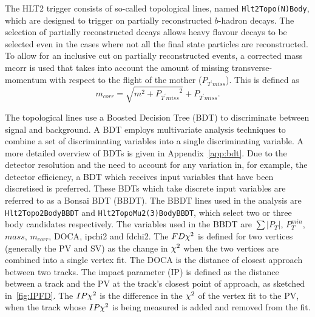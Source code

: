    
The HLT2 trigger consists of so-called topological lines, named \texttt{Hlt2Topo(N)Body}, which are designed to trigger on partially reconstructed $b$-hadron decays. The selection of partially reconstructed decays allows heavy flavour decays to be selected even in the cases where not all the final state particles are reconstructed.    
To allow for an inclusive cut on partially reconstructed events, a corrected mass \gls{mcorr} is used that takes into account the amount of missing transverse-momentum with respect to the flight of the mother ($P_{T^{\prime} miss}$). This is defined as
\begin{equation}
  m_{corr} = \sqrt{m^{2} + {P_{T^{\prime} miss}}^{2}} + P_{T^{\prime}miss}.
\end{equation}

The topological lines use a Boosted Decision Tree (\Gls{BDT}) \cite{miniboone} to discriminate between signal and background. A BDT employs multivariate analysis techniques to combine a set of discriminating variables into a single discriminating variable. A more detailed overview of BDTs is given in Appendix~\ref{app:bdt}. Due to the detector resolution and the need to account for any variation in, for example, the detector efficiency, a BDT which receives input variables that have been discretised is preferred. These BDTs which take discrete input variables are referred to as a Bonsai BDT (\Gls{BBDT})\cite{bonsai}. The BBDT lines used in the \Lbpi analysis are \texttt{Hlt2Topo2BodyBBDT} and \texttt{Hlt2TopoMu2(3)BodyBBDT}, which select two or three body candidates respectively. The variables used in the BBDT are $\sum|P_{T}|$, $P^{min}_{T}$, $mass$, $m_{corr}$, \Gls{DOCA}, \gls{ipchi2} and \gls{fdchi2}\cite{BBDTstuff}\cite{Puig:1970930}. The $FD\chi^2$ is defined for two vertices (generally the PV and SV) as the change in $\chi^2$ when the two vertices are combined into a single vertex fit. The DOCA is the distance of closest approach between two tracks. The impact parameter (\Gls{IP}) is defined as the distance between a track and the PV at the track's closest point of approach, as sketched in~\autoref{fig:IPFD}. The $IP\chi^2$ is the difference in the $\chi^2$ of the vertex fit to the PV, when the track whose $IP\chi^2$ is being measured is added and removed from the fit.

